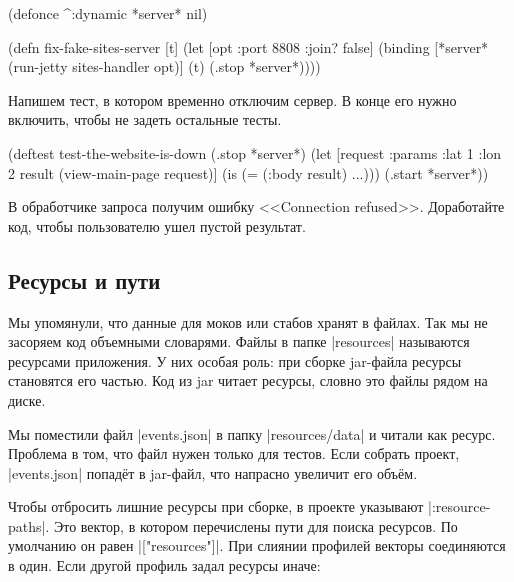 
\begin{english}
  \begin{clojure}
(defonce ^:dynamic *server* nil)

(defn fix-fake-sites-server [t]
  (let [opt {:port 8808 :join? false}]
    (binding [*server* (run-jetty sites-handler opt)]
      (t)
      (.stop *server*))))
  \end{clojure}
\end{english}

Напишем тест, в котором временно отключим сервер. В конце его нужно включить,
чтобы не задеть остальные тесты.

\begin{english}
  \begin{clojure}
(deftest test-the-website-is-down
  (.stop *server*)
  (let [request {:params {:lat 1 :lon 2}}
        result (view-main-page request)]
    (is (= (:body result) {...})))
  (.start *server*))
  \end{clojure}
\end{english}

В обработчике запроса получим ошибку <<Connection refused>>. Доработайте код,
чтобы пользователю ушел пустой результат.

\subsection{Ресурсы и пути}

\label{resources}


Мы упомянули, что данные для моков или стабов хранят в файлах. Так мы не
засоряем код объемными словарями. Файлы в папке \spverb|resources| называются
ресурсами приложения. У них особая роль: при сборке jar-файла ресурсы становятся
его частью. Код из jar читает ресурсы, словно это файлы рядом на диске.

Мы поместили файл \spverb|events.json| в папку \spverb|resources/data| и читали
как ресурс. Проблема в том, что файл нужен только для тестов. Если собрать
проект, \spverb|events.json| попадёт в jar-файл, что напрасно увеличит его
объём.

Чтобы отбросить лишние ресурсы при сборке, в проекте указывают
\spverb|:resource-paths|. Это вектор, в котором перечислены пути для поиска
ресурсов. По умолчанию он равен \spverb|["resources"]|. При слиянии профилей
векторы соединяются в один. Если другой профиль задал ресурсы иначе:

